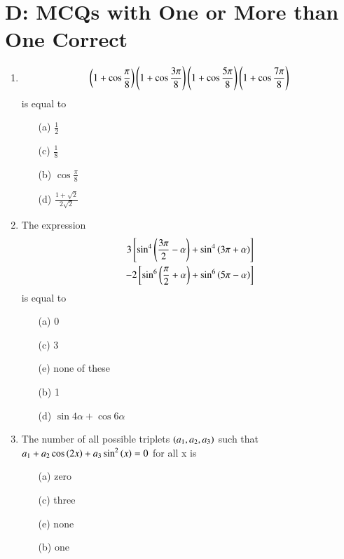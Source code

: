 \documentclass[journal,12pt,twocolumn,article]{IEEEtran}
\theoremstyle{remark}
\begin{document}
\section*{D: MCQs with One or More than One Correct}
\begin{enumerate}
\item 
\begin{align*}
\left(1 + \cos\frac{\pi}{8}\right)\left(1 + \cos\frac{3\pi}{8}\right)\left(1 + \cos\frac{5\pi}{8}\right)\left(1 + \cos\frac{7\pi}{8}\right) 
\end{align*}
is equal to
\hfill{}
\begin{multicols}{2}
\begin{enumerate}
\item[(a)] $\frac{1}{2}$
\item[(c)] $\frac{1}{8}$
\columnbreak
\item[(b)] $\cos \frac{\pi}{8}$
\item[(d)] $\frac{1+\sqrt{2}}{2\sqrt{2}}$
\end{enumerate}
\end{multicols}
\item The expression 
\begin{align*}
3{}\left[\sin^4\left(\frac{3\pi}{2} - \alpha\right) + \sin^4\left(3\pi + \alpha\right)\right]  \\ - 2{}\left[\sin^6\left(\frac{\pi}{2} + \alpha\right) + \sin^6\left(5\pi - \alpha\right)\right]
\end{align*}
is equal to
\hfill{}
\begin{multicols}{2}
\begin{enumerate}
\item[(a)] 0
\item[(c)] 3
\item[(e)] none of these
\columnbreak
\item[(b)] 1
\item[(d)] $\sin4\alpha + \cos6\alpha$
\end{enumerate}
\end{multicols}
\item The number of all possible triplets $\left(a_1, a_2, a_3\right)$ such that $a_1 + a_2 \cos\left(2x\right) + a_3\sin^2\left(x\right) = 0$ for all x is
\hfill{}
\begin{multicols}{2}
\begin{enumerate}
\item[(a)] zero
\item[(c)] three
\item[(e)] none
\columnbreak
\item[(b)] one

\end{enumerate}
\end{multicols}
\end{enumerate}
\end{document}
